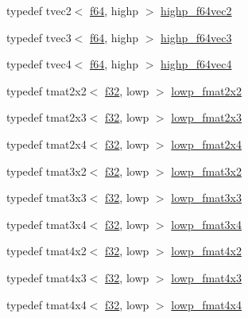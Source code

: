 \begin{DoxyCompactItemize}
typedef tvec2$<$ \hyperlink{group__gtc__type__precision_ga2bba392e555124b36cde6abba349bab3}{f64}, highp $>$ \hyperlink{namespaceglm_a8505b425f783dae009868544b702bbd9}{highp\+\_\+f64vec2}
\item 
typedef tvec3$<$ \hyperlink{group__gtc__type__precision_ga2bba392e555124b36cde6abba349bab3}{f64}, highp $>$ \hyperlink{namespaceglm_a106c06c5b5dbb5d42f5756bd5ddf5cc5}{highp\+\_\+f64vec3}
\item 
typedef tvec4$<$ \hyperlink{group__gtc__type__precision_ga2bba392e555124b36cde6abba349bab3}{f64}, highp $>$ \hyperlink{namespaceglm_a9cd05269ce35a146935adeba5e63d189}{highp\+\_\+f64vec4}
\item 
typedef tmat2x2$<$ \hyperlink{group__gtc__type__precision_ga0ec999b57f5330d9021256e96038df04}{f32}, lowp $>$ \hyperlink{namespaceglm_aa860329771ca51dbaa48cf16a1ecfc34}{lowp\+\_\+fmat2x2}
\item 
typedef tmat2x3$<$ \hyperlink{group__gtc__type__precision_ga0ec999b57f5330d9021256e96038df04}{f32}, lowp $>$ \hyperlink{namespaceglm_a96419cd63d22eebac48b2529c5954538}{lowp\+\_\+fmat2x3}
\item 
typedef tmat2x4$<$ \hyperlink{group__gtc__type__precision_ga0ec999b57f5330d9021256e96038df04}{f32}, lowp $>$ \hyperlink{namespaceglm_aa5b4e4ba427f641d864880d821560810}{lowp\+\_\+fmat2x4}
\item 
typedef tmat3x2$<$ \hyperlink{group__gtc__type__precision_ga0ec999b57f5330d9021256e96038df04}{f32}, lowp $>$ \hyperlink{namespaceglm_a6649f0975e5e98ab9c1c289e0430e43d}{lowp\+\_\+fmat3x2}
\item 
typedef tmat3x3$<$ \hyperlink{group__gtc__type__precision_ga0ec999b57f5330d9021256e96038df04}{f32}, lowp $>$ \hyperlink{namespaceglm_a768d23520c7658624b9f212324ae8db0}{lowp\+\_\+fmat3x3}
\item 
typedef tmat3x4$<$ \hyperlink{group__gtc__type__precision_ga0ec999b57f5330d9021256e96038df04}{f32}, lowp $>$ \hyperlink{namespaceglm_a7d85ff21b93a179051735bc93ffa2a50}{lowp\+\_\+fmat3x4}
\item 
typedef tmat4x2$<$ \hyperlink{group__gtc__type__precision_ga0ec999b57f5330d9021256e96038df04}{f32}, lowp $>$ \hyperlink{namespaceglm_adc02280ed618235bb07dd06dd40aa547}{lowp\+\_\+fmat4x2}
\item 
typedef tmat4x3$<$ \hyperlink{group__gtc__type__precision_ga0ec999b57f5330d9021256e96038df04}{f32}, lowp $>$ \hyperlink{namespaceglm_a4a9685a8070dd173dd7d713e185a874c}{lowp\+\_\+fmat4x3}
\item 
typedef tmat4x4$<$ \hyperlink{group__gtc__type__precision_ga0ec999b57f5330d9021256e96038df04}{f32}, lowp $>$ \hyperlink{namespaceglm_ac924479e50d7a275061807b2774a5d28}{lowp\+\_\+fmat4x4}

\end{DoxyCompactItemize}
